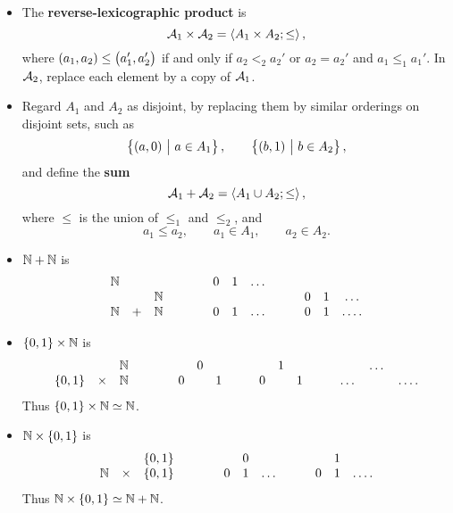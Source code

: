 \begin{definition}
\hfill
\begin{itemize}
\item The \textbf{reverse-lexicographic product} is
$$ \mathcal{A}_1 \times \mathcal{A}_2 = \left\langle A_1 \times A_2; \le \right\rangle, $$
where $ \br{a_1, a_2} \le \br{a_1', a_2'} $ if and only if $ a_2 <_2 a_2' $ or $ a_2 = a_2' $ and $ a_1 \le_1 a_1' $. In $ \mathcal{A}_2 $, replace each element by a copy of $ \mathcal{A}_1 $.
\item Regard $ A_1 $ and $ A_2 $ as disjoint, by replacing them by similar orderings on disjoint sets, such as
$$ \cbr{\br{a, 0} \st a \in A_1}, \qquad \cbr{\br{b, 1} \st b \in A_2}, $$
and define the \textbf{sum}
$$ \mathcal{A}_1 + \mathcal{A}_2 = \left\langle A_1 \cup A_2; \le \right\rangle, $$
where $ \le $ is the union of $ \le_1 $ and $ \le_2 $, and
$$ a_1 \le a_2, \qquad a_1 \in A_1, \qquad a_2 \in A_2. $$
\end{itemize}
\end{definition}

\pagebreak

\begin{example*}
\hfill
\begin{itemize}
\item $ \mathbb{N} + \mathbb{N} $ is
$$
\begin{array}{ccccccccccc}
\mathbb{N} & & & \qquad & 0 & 1 & \dots & \quad & & & \\
& & \mathbb{N} & \qquad & & & & \quad & 0 & 1 & \dots \\
\mathbb{N} & + & \mathbb{N} & \qquad & 0 & 1 & \dots & \quad & 0 & 1 & \dots.
\end{array}
$$
\item $ \cbr{0, 1} \times \NN $ is
$$
\begin{array}{ccccccccccccccc}
& & \NN & \qquad & & 0 & & \quad & & 1 & & \quad & & \dots & \\
\cbr{0, 1} & \times & \NN & \qquad & 0 & & 1 & \quad & 0 & & 1 & \quad & \dots & & \dots.
\end{array}
$$
Thus $ \cbr{0, 1} \times \NN \simeq \NN $.
\item $ \NN \times \cbr{0, 1} $ is
$$
\begin{array}{ccccccccccc}
& & \cbr{0, 1} & \qquad & & 0 & & \quad & & 1 & \\
\NN & \times & \cbr{0, 1} & \qquad & 0 & 1 & \dots & \quad & 0 & 1 & \dots.
\end{array}
$$
Thus $ \NN \times \cbr{0, 1} \simeq \NN + \NN $.
\end{itemize}
\end{example*}

